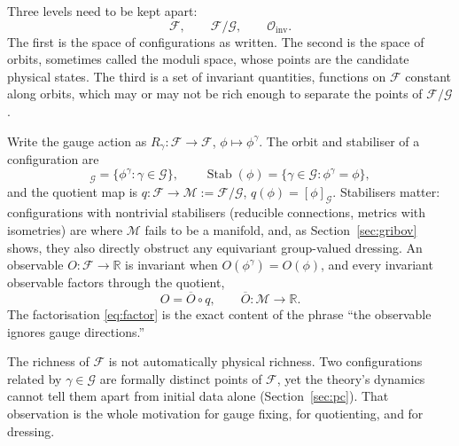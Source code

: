 \documentclass[11pt]{article}
\theoremstyle{plain}
\theoremstyle{definition}
\theoremstyle{remark}
\newcommand{\Stab}{\operatorname{Stab}}
\newcommand{\F}{\mathcal F}
\newcommand{\G}{\mathcal G}
\begin{document}
Three levels need to be kept apart:
\begin{equation}
\F, \qquad \F/\G, \qquad \mathcal O_{\mathrm{inv}}.
\end{equation}
The first is the space of configurations as written. The second is the space of orbits, sometimes called the moduli space, whose points are the candidate physical states. The third is a set of invariant quantities, functions on $\F$ constant along orbits, which may or may not be rich enough to separate the points of $\F/\G$.

Write the gauge action as $R_\gamma:\F\to\F$, $\phi\mapsto\phi^\gamma$. The orbit and stabiliser of a configuration are
\begin{equation}
[\phi]_\G=\{\phi^\gamma:\gamma\in\G\},\qquad \Stab(\phi)=\{\gamma\in\G:\phi^\gamma=\phi\},
\end{equation}
and the quotient map is $q:\F\to\mathcal M:=\F/\G$, $q(\phi)=[\phi]_\G$. Stabilisers matter: configurations with nontrivial stabilisers (reducible connections, metrics with isometries) are where $\mathcal M$ fails to be a manifold, and, as Section~\ref{sec:gribov} shows, they also directly obstruct any equivariant group-valued dressing. An observable $O:\F\to\mathbb R$ is invariant when $O(\phi^\gamma)=O(\phi)$, and every invariant observable factors through the quotient,
\begin{equation}\label{eq:factor}
O=\overline O\circ q,\qquad \overline O:\mathcal M\to\mathbb R .
\end{equation}
The factorisation \eqref{eq:factor} is the exact content of the phrase ``the observable ignores gauge directions.''

The richness of $\F$ is not automatically physical richness. Two configurations related by $\gamma\in\G$ are formally distinct points of $\F$, yet the theory's dynamics cannot tell them apart from initial data alone (Section~\ref{sec:pc}). That observation is the whole motivation for gauge fixing, for quotienting, and for dressing.
\end{document}
